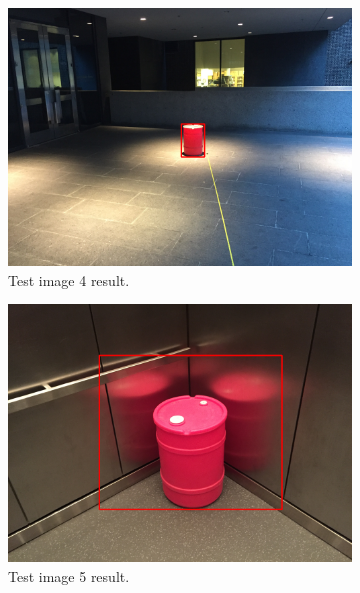 \documentclass[a4paper]{article}
\begin{document}
\begin{figure}[!tbp]
  \centering
  \begin{subfigure}[b]{.4\textwidth}
    \includegraphics[width=1\textwidth]{test_image4.png}
\caption{\label{fig:test4}Test image 4 result.}
  \end{subfigure}
  \begin{subfigure}[b]{.4\textwidth}
    \includegraphics[width=1\textwidth]{test_image5.png}
\caption{\label{fig:test5}Test image 5 result.}
  \end{subfigure}
  \caption{\label{fig:test3_set}}
\end{figure}
\end{document}
